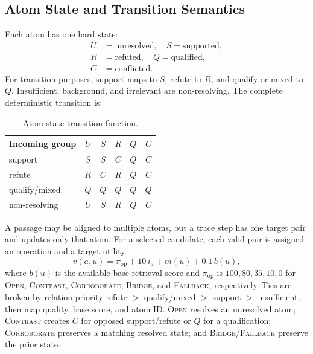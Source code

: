 \subsection{Atom State and Transition Semantics}
\label{supp:state}

Each atom has one hard state:
\[
\begin{aligned}
U&=\text{unresolved},\quad S=\text{supported},\\
R&=\text{refuted},\quad Q=\text{qualified},\\
C&=\text{conflicted}.
\end{aligned}
\]
For transition purposes, support maps to \(S\), refute to \(R\), and qualify
or mixed to \(Q\).  Insufficient, background, and irrelevant are
non-resolving.  The complete deterministic transition is:

\begin{table}[t]
\centering
\scriptsize
\setlength{\tabcolsep}{2.5pt}
\begin{tabular}{lccccc}
\hline
Incoming group & \(U\) & \(S\) & \(R\) & \(Q\) & \(C\) \\
\hline
support & \(S\) & \(S\) & \(C\) & \(Q\) & \(C\) \\
refute & \(R\) & \(C\) & \(R\) & \(Q\) & \(C\) \\
qualify/mixed & \(Q\) & \(Q\) & \(Q\) & \(Q\) & \(Q\) \\
non-resolving & \(U\) & \(S\) & \(R\) & \(Q\) & \(C\) \\
\hline
\end{tabular}
\caption{Atom-state transition function.}
\label{tab:supp-state-transition}
\end{table}

A passage may be aligned to multiple atoms, but a trace step has one target
pair and updates only that atom.  For a selected candidate, each valid pair is
assigned an operation and a target utility
\begin{equation}
v(a,u)=\pi_{\mathrm{op}}+10\,i_a+m(u)+0.1\,b(u),
\label{eq:supp-target-pair}
\end{equation}
where \(b(u)\) is the available base retrieval score and
\(\pi_{\mathrm{op}}\) is \(100,80,35,10,0\) for
\textsc{Open}, \textsc{Contrast}, \textsc{Corroborate}, \textsc{Bridge}, and
\textsc{Fallback}, respectively.  Ties are broken by relation priority
refute \(>\) qualify/mixed \(>\) support \(>\) insufficient, then map quality,
base score, and atom ID.  \textsc{Open} resolves an unresolved atom;
\textsc{Contrast} creates \(C\) for opposed support/refute or \(Q\) for a
qualification; \textsc{Corroborate} preserves a matching resolved state; and
\textsc{Bridge}/\textsc{Fallback} preserve the prior state.


